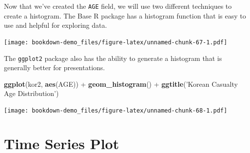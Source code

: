 \documentclass[]{book}
\newenvironment{Shaded}{\begin{snugshade}}{\end{snugshade}}
\newcommand{\KeywordTok}[1]{\textcolor[rgb]{0.13,0.29,0.53}{\textbf{{#1}}}}
\newcommand{\DataTypeTok}[1]{\textcolor[rgb]{0.13,0.29,0.53}{{#1}}}
\newcommand{\DecValTok}[1]{\textcolor[rgb]{0.00,0.00,0.81}{{#1}}}
\newcommand{\StringTok}[1]{\textcolor[rgb]{0.31,0.60,0.02}{{#1}}}
\newcommand{\CommentTok}[1]{\textcolor[rgb]{0.56,0.35,0.01}{\textit{{#1}}}}
\newcommand{\OtherTok}[1]{\textcolor[rgb]{0.56,0.35,0.01}{{#1}}}
\newcommand{\NormalTok}[1]{{#1}}
\begin{document}
\begin{Shaded}
\end{Shaded}

Now that we've created the \texttt{AGE} field, we will use two different
techniques to create a histogram. The Base R package has a histogram
function that is easy to use and helpful for exploring data.

\begin{Shaded}
\end{Shaded}

\texttt{[image: bookdown-demo\_files/figure-latex/unnamed-chunk-67-1.pdf]}

The \texttt{ggplot2} package also has the ability to generate a
histogram that is generally better for presentations.

\begin{Shaded}
\begin{Highlighting}[]
\KeywordTok{ggplot}\NormalTok{(kor2, }\KeywordTok{aes}\NormalTok{(AGE)) +}\StringTok{ }\KeywordTok{geom_histogram}\NormalTok{() +}\StringTok{ }\KeywordTok{ggtitle}\NormalTok{(}\StringTok{'Korean Casualty Age Distribution'}\NormalTok{)}
\end{Highlighting}
\end{Shaded}

\texttt{[image: bookdown-demo\_files/figure-latex/unnamed-chunk-68-1.pdf]}

\section{Time Series Plot}\label{time-series-plot}
\end{document}

